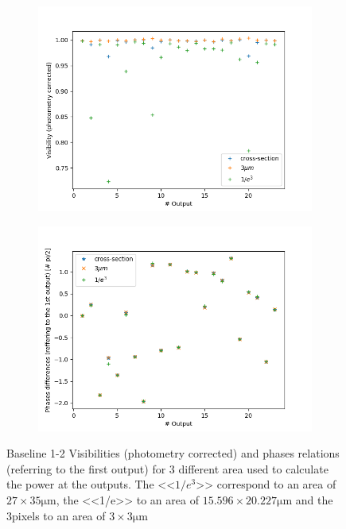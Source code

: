 \begin{figure}[htbp]
  \centering
  \begin{subfigure}[b]{.45\textwidth}
    \centering
    \includegraphics[scale=.4]{picture/geometry/visi_flat_3area.png}
    \caption{}
\end{subfigure}%
\hspace{.5cm}
\begin{subfigure}[b]{.45\textwidth}
  \centering
  \includegraphics[scale=.4]{picture/geometry/phases_flat_3area.png}
  \caption{}
  \end{subfigure}
  \caption{Baseline 1-2 Visibilities (photometry corrected) and phases relations
    (referring to the first output) for 3 different area used to
    calculate the power at the outputs. The <<$1/e^3$>> correspond to
    an area of $27\times 35\si{\micro\meter}$, the <<1/e>> to an area of
    $15.596\times20.227\si{\micro\meter}$ and the 3pixels to an area
    of $3\times 3\si{\micro\meter}$}
  \label{fig:visi_phases_area}
 
\end{figure}


